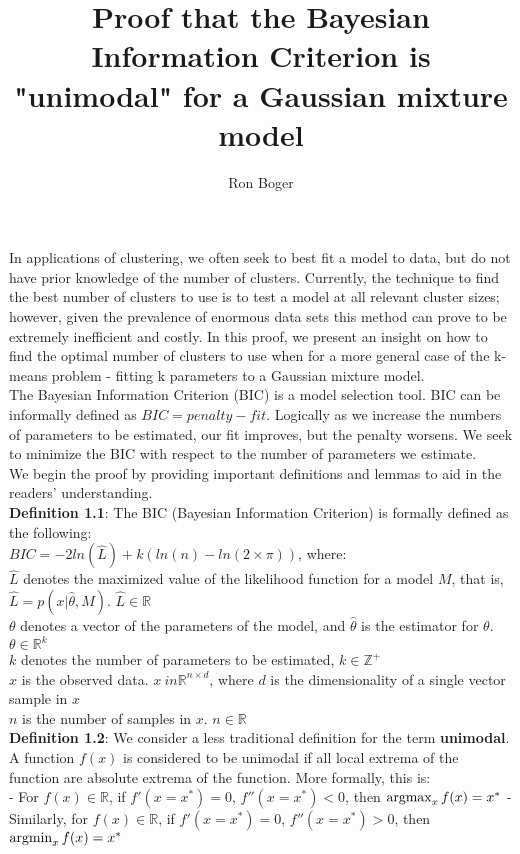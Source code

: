 \documentclass{article}
\title{Proof that the Bayesian Information Criterion is "unimodal" for a Gaussian mixture model}
\author{Ron Boger}
\date{}
\newcommand{\argmin}{\operatornamewithlimits{argmin}}
\newcommand{\argmax}{\operatornamewithlimits{argmax}}
\begin{document}
\maketitle

In applications of clustering, we often seek to best fit a model to data, but do not have prior knowledge of the number of clusters. Currently, the technique to find the best number of clusters to use is to test a model at all relevant cluster sizes; however, given the prevalence of enormous data sets this method can prove to be extremely inefficient and costly. In this proof, we present an insight on how to find the optimal number of clusters to use when for a more general case of the k-means problem - fitting k parameters to a Gaussian mixture model.\\

The Bayesian Information Criterion (BIC) is a model selection tool. BIC can be informally defined as \(BIC = penalty - fit\). Logically as we increase the numbers of parameters to be estimated, our fit improves, but the penalty worsens. We seek to minimize the BIC with respect to the number of parameters we estimate.\\

We begin the proof by providing important definitions and lemmas to aid in the readers' understanding.\\

\textbf{Definition 1.1}: The BIC (Bayesian Information Criterion) is formally defined as the following:\\
\(BIC = -2ln(\hat{L}) + k(ln(n) - ln(2 \times \pi))\), where:\\
\(\hat{L}\) denotes the maximized value of the likelihood function for a model \(M\), that is, \(\hat{L} = p(x|\hat{\theta}, M)\). \(\hat{L} \in \mathbb{R}\)\\
\(\theta\) denotes a vector of the parameters of the model, and \(\hat{\theta}\) is the estimator for \(\theta\). \(\theta \in \mathbb{R}^k\)\\
\(k\) denotes the number of parameters to be estimated, \(k \in \mathbb{Z}^{+}\)\\
\(x\) is the observed data. \(x \ in \mathbb{R}^{n \times d}\), where \(d\) is the dimensionality of a single vector sample in \(x\)\\
\(n\) is the number of samples in \(x\). \(n \in \mathbb{R}\)\\

\textbf{Definition 1.2}: We consider a less traditional definition for the term \textbf{unimodal}. A function \(f(x)\) is considered to be unimodal if all local extrema of the function are absolute extrema of the function. More formally, this is:\\
- For \(f(x) \in \mathbb{R}\), if \(f'(x = x^{*}) = 0\), \(f''(x= x^{*}) <0\), then \(\argmax_{x} f(x) = x^*\)
- Similarly, for \(f(x) \in \mathbb{R}\), if \(f'(x = x^{*}) = 0\), \(f''(x= x^{*}) > 0\), then \(\argmin_{x} f(x) = x^{*}\)
\end{document}
